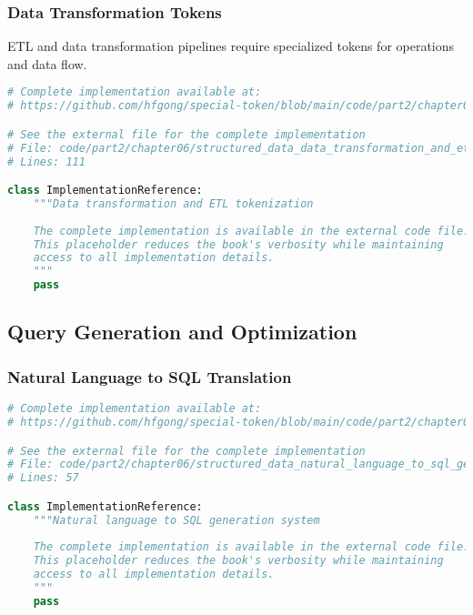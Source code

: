 \subsubsection{Data Transformation Tokens}

ETL and data transformation pipelines require specialized tokens for operations and data flow.

\begin{lstlisting}[language=Python, caption={Data transformation and ETL tokenization}]
# Complete implementation available at:
# https://github.com/hfgong/special-token/blob/main/code/part2/chapter06/structured_data_data_transformation_and_etl_to.py

# See the external file for the complete implementation
# File: code/part2/chapter06/structured_data_data_transformation_and_etl_to.py
# Lines: 111

class ImplementationReference:
    """Data transformation and ETL tokenization
    
    The complete implementation is available in the external code file.
    This placeholder reduces the book's verbosity while maintaining
    access to all implementation details.
    """
    pass
\end{lstlisting}

\subsection{Query Generation and Optimization}

\subsubsection{Natural Language to SQL Translation}

\begin{lstlisting}[language=Python, caption={Natural language to SQL generation system}]
# Complete implementation available at:
# https://github.com/hfgong/special-token/blob/main/code/part2/chapter06/structured_data_natural_language_to_sql_genera.py

# See the external file for the complete implementation
# File: code/part2/chapter06/structured_data_natural_language_to_sql_genera.py
# Lines: 57

class ImplementationReference:
    """Natural language to SQL generation system
    
    The complete implementation is available in the external code file.
    This placeholder reduces the book's verbosity while maintaining
    access to all implementation details.
    """
    pass
\end{lstlisting}

